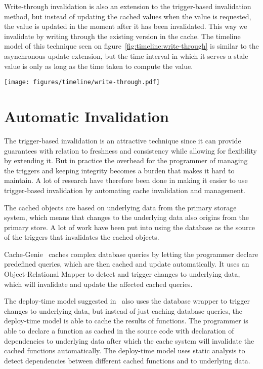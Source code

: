 Write-through invalidation is also an extension to the trigger-based invalidation method, but instead of updating the cached values when the value is requested, the value is updated in the moment after it has been invalidated. This way we invalidate by writing through the existing version in the cache. The timeline model of this technique seen on figure~\ref{fig:timeline:write-through} is similar to the asynchronous update extension, but the time interval in which it serves a stale value is only as long as the time taken to compute the value.

\begin{figure*}[ht!]
  \centering
  \texttt{[image: figures/timeline/write-through.pdf]}
  \caption{The lifecycle of the \emph{write-through invalidation} technique}
  \label{fig:timeline:write-through}
\end{figure*}


\section{Automatic Invalidation}
\label{subsec:automatic_invalidation}

The trigger-based invalidation is an attractive technique since it can provide guarantees with relation to freshness and consistency while allowing for flexibility by extending it. But in practice the overhead for the programmer of managing the triggers and keeping integrity becomes a burden that makes it hard to maintain. A lot of research have therefore been done in making it easier to use trigger-based invalidation by automating cache invalidation and management.

The cached objects are based on underlying data from the primary storage system, which means that changes to the underlying data also origins from the primary store. A lot of work have been put into using the database as the source of the triggers that invalidates the cached objects.

Cache-Genie~\cite{paper:cache-genie} caches complex database queries by letting the programmer declare predefined queries, which are then cached and update automatically. It uses an Object-Relational Mapper to detect and trigger changes to underlying data, which will invalidate and update the affected cached queries.

The deploy-time model suggested in~\cite{paper:deploy-time} also uses the database wrapper to trigger changes to underlying data, but instead of just caching database queries, the deploy-time model is able to cache the results of functions. The programmer is able to declare a function as cached in the source code with declaration of dependencies to underlying data after which the cache system will invalidate the cached functions automatically. The deploy-time model uses static analysis to detect dependencies between different cached functions and to underlying data.

